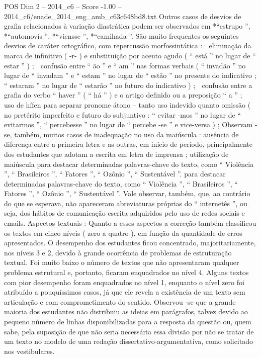 \begin{textsample}{POS Dim 2 – 2014\_c6 – Score -1.00 – 2014\_c6/enade\_2014\_eng\_amb\_c63c648bd8.txt}
Outros casos de desvios de grafia relacionados à variação diastrática podem ser observados em *“estrupo ”, *“automovís ”, *“viensse ”, *“camihada ”.
São muito frequentes os seguintes desvios de caráter ortográfico, com repercussão morfossintática :  eliminação da marca de infinitivo ( -r- ) e substituição por acento agudo ( “ está ” no lugar de “ estar ” ) ;  confusão entre “ ão ” e “ am ” nas formas verbais ( “ invadão ” no lugar de “ invadam ” e “ estam ” no lugar de “ estão ” no presente do indicativo ; “ estaram ” no lugar de “ estarão ” no futuro do indicativo ) ;  confusão entre a grafia do verbo “ haver ” ( “ há ” ) e o artigo definido ou a preposição “ a ” ;  uso de hífen para separar pronome átono – tanto uso indevido quanto omissão ( no pretérito imperfeito e futuro do subjuntivo : “ evitar -mos ” no lugar de “ evitarmos ”, “ percebesse ” no lugar de “ percebe -se ” e vice-versa ) ; Observam -se, também, muitos casos de inadequação no uso da maiúscula : ausência de diferença entre a primeira letra e as outras, em início de período, principalmente dos estudantes que adotam a escrita em letra de imprensa ; utilização de maiúscula para destacar determinadas palavras-chave do texto, como “ Violência ”, “ Brasileiros ”, “ Fatores ”, “ Ozônio ”, “ Sustentável ”. para destacar determinadas palavras-chave do texto, como “ Violência ”, “ Brasileiros ”, “ Fatores ”, “ Ozônio ”, “ Sustentável ”.
Vale observar, também, que, ao contrário do que se esperava, não apareceram abreviaturas próprias do “ internetês ”, ou seja, dos hábitos de comunicação escrita adquiridos pelo uso de redes sociais e emails.
Aspectos textuais : Quanto a esses aspectos a correção também classificou os textos em cinco níveis ( zero a quatro ), em função da quantidade de erros apresentados.
O desempenho dos estudantes ficou concentrado, majoritariamente, nos níveis 3 e 2, devido à grande ocorrência de problemas de estruturação textual.
Foi muito baixo o número de textos que não apresentaram qualquer problema estrutural e, portanto, ficaram enquadrados no nível 4.
Alguns textos com pior desempenho foram enquadrados no nível 1, enquanto o nível zero foi atribuído a pouquíssimos casos, já que ele revela a existência de um texto sem articulação e com comprometimento do sentido.
Observou -se que a grande maioria dos estudantes não distribuiu as ideias em parágrafos, talvez devido ao pequeno número de linhas disponibilizadas para a resposta da questão ou, quem sabe, pela suposição de que não seria necessária essa divisão por não se tratar de um texto no modelo de uma redação dissertativo-argumentativa, como solicitado nos vestibulares.

\end{textsample}
